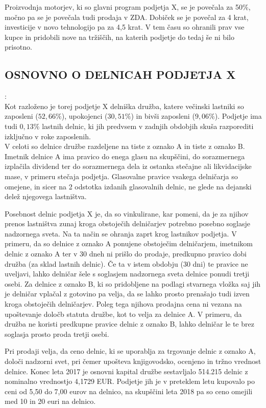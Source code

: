 \documentclass[12pt,a4paper]{amsart}
\theoremstyle{definition} %
\theoremstyle{plain} %
\begin{document}
Proizvodnja motorjev, ki so glavni program podjetja X, se je povečala za 50\%, močno pa se je povečala tudi prodaja v ZDA. Dobiček se je povečal za 4 krat, investicije v novo tehnologijo pa za 4,5 krat. V tem času so ohranili prav vse kupce in pridobili nove na tržiščih, na katerih podjetje do tedaj še ni bilo prisotno.



\subsection{OSNOVNO O DELNICAH PODJETJA X}:\\

Kot razloženo je torej podjetje X delniška družba, katere večinski lastniki so zaposleni ($52,66\%$), upokojenci ($30,51\%$) in bivši zaposleni ($9,06\%$). Podjetje ima tudi $0,13\%$ lastnih delnic, ki jih predvsem v zadnjih obdobjih skuša razporediti izključno v roke zaposlenih.\\
V celoti so delnice družbe razdeljene na tiste z oznako A in tiste z oznako B. Imetnik delnice A ima pravico do enega glasu na skupščini, do sorazmernega izplačila dividend ter do sorazmernega dela iz ostanka stečajne ali likvidacijske mase, v primeru stečaja podjetja. Glasovalne pravice vsakega delničarja so omejene, in sicer na 2 odstotka izdanih glasovalnih delnic, ne glede na dejanski delež njegovega lastništva.\par
Posebnost delnic podjetja X je, da so vinkulirane, kar pomeni, da je za njihov prenos lastništva zunaj kroga obstoječih delničarjev potrebno posebno soglasje nadzornega sveta. Na ta način se ohranja zaprt krog lastnikov podjetja. V primeru, da so delnice z oznako A ponujene obstoječim delničarjem, imetnikom delnic z oznako A ter v 30 dneh ni prišlo do prodaje, predkupno pravico dobi družba (za sklad lastnih delnic). Če ta v istem obdobju (30 dni) te pravice ne uveljavi, lahko delničar šele s soglasjem nadzornega sveta delnice ponudi tretji osebi.
Za delnice z oznako B, ki so pridobljene na podlagi stvarnega vložka saj jih je delničar vplačal z gotovino pa velja, da se lahko prosto prenašajo tudi izven kroga obstoječih delničarjev. Poleg tega njihova prodajna cena ni vezana na upoštevanje določb statuta družbe, kot to velja za delnice A. V primeru, da družba ne koristi predkupne pravice delnic z oznako B, lahko delničar le te brez soglasja prosto proda tretji osebi.\par
Pri prodaji velja, da ceno delnic, ki se uporablja za trgovanje delnic z oznako A, določi nadzorni svet, pri čemer upošteva knjigovodsko, ocenjeno in tržno vrednost delnice. Konec leta 2017 je osnovni kapital družbe sestavljalo 514.215 delnic z nominalno vrednostjo 4,1729 EUR. Podjetje jih je v preteklem letu kupovalo po ceni od 5,50 do 7,00 eurov na delnico, na skupščini leta 2018 pa so ceno omejili med 10 in 20 euri na delnico.
\end{document}
